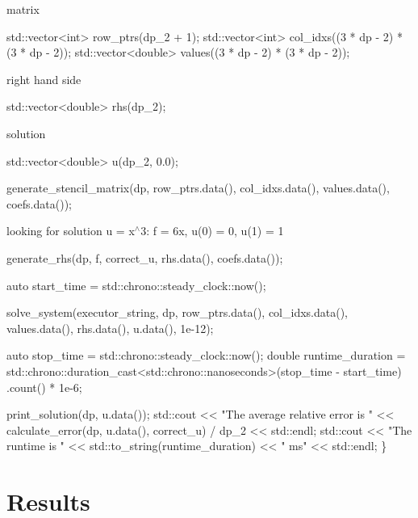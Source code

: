 {\ttfamily  matrix}

{\ttfamily 
\begin{DoxyCode}
std::vector<int> row\_ptrs(dp\_2 + 1);
std::vector<int> col\_idxs((3 * dp - 2) * (3 * dp - 2));
std::vector<double> values((3 * dp - 2) * (3 * dp - 2));
\end{DoxyCode}
}

{\ttfamily  right hand side}

{\ttfamily 
\begin{DoxyCode}
std::vector<double> rhs(dp\_2);
\end{DoxyCode}
}

{\ttfamily  solution}

{\ttfamily 
\begin{DoxyCode}
std::vector<double> u(dp\_2, 0.0);

generate\_stencil\_matrix(dp, row\_ptrs.data(), col\_idxs.data(), values.data(),
                        coefs.data());
\end{DoxyCode}
}

{\ttfamily  looking for solution u = x$^\wedge$3\+: f = 6x, u(0) = 0, u(1) = 1}

{\ttfamily 
\begin{DoxyCode}
    generate\_rhs(dp, f, correct\_u, rhs.data(), coefs.data());

    \textcolor{keyword}{auto} start\_time = std::chrono::steady\_clock::now();

    solve\_system(executor\_string, dp, row\_ptrs.data(), col\_idxs.data(),
                 values.data(), rhs.data(), u.data(), 1e-12);

    \textcolor{keyword}{auto} stop\_time = std::chrono::steady\_clock::now();
    \textcolor{keywordtype}{double} runtime\_duration =
        std::chrono::duration\_cast<std::chrono::nanoseconds>(stop\_time -
                                                             start\_time)
            .count() *
        1e-6;

    print\_solution(dp, u.data());
    std::cout << \textcolor{stringliteral}{"The average relative error is "}
              << calculate\_error(dp, u.data(), correct\_u) / dp\_2 << std::endl;
    std::cout << \textcolor{stringliteral}{"The runtime is "} << std::to\_string(runtime\_duration) << \textcolor{stringliteral}{" ms"}
              << std::endl;
\}
\end{DoxyCode}
 \label{_Results}%
\section*{Results}}


